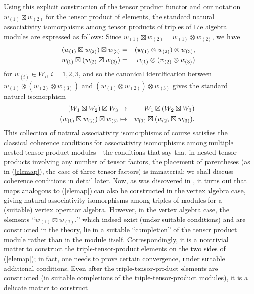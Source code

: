 \documentclass[12pt]{article}
\begin{document}
\begin{rema}
{\rm Using this explicit construction of the tensor product functor
and our notation $w_{(1)}\boxtimes w_{(2)}$ for the tensor product of
elements, the standard natural associativity isomorphisms among tensor
products of triples of Lie algebra modules are expressed as follows:
Since $w_{(1)}\boxtimes w_{(2)} = w_{(1)}\otimes w_{(2)}$, we have
\begin{eqnarray}\
(w_{(1)}\boxtimes w_{(2)})\boxtimes w_{(3)}&=&
(w_{(1)}\otimes w_{(2)})\otimes w_{(3)},\nonumber\\
w_{(1)}\boxtimes(w_{(2)}\boxtimes w_{(3)})&=&
w_{(1)}\otimes(w_{(2)}\otimes w_{(3)})\nonumber
\end{eqnarray}
for $w_{(i)}\in W_i$, $i=1,2,3$, and so
the canonical identification between
$w_{(1)}\otimes(w_{(2)}\otimes w_{(3)})$ and $(w_{(1)}\otimes
w_{(2)})\otimes w_{(3)}$ gives the standard natural isomorphism
\begin{eqnarray}
(W_1\boxtimes W_2)\boxtimes W_3 &\to & W_1\boxtimes (W_2\boxtimes W_3)\nonumber\\
(w_{(1)}\boxtimes w_{(2)})\boxtimes w_{(3)} &\mapsto &
w_{(1)}\boxtimes(w_{(2)}\boxtimes w_{(3)}).\label{elemap}
\end{eqnarray}
This collection of natural associativity isomorphisms of course
satisfies the classical coherence conditions for associativity
isomorphisms among multiple nested tensor product modules---the
conditions that say that in nested tensor products involving any
number of tensor factors, the placement of parentheses (as in
(\ref{elemap}), the case of three tensor factors) is immaterial; we
shall discuss coherence conditions in detail later.  Now, as was
discovered in \cite{tensor4}, it turns out that maps analogous to
(\ref{elemap}) can also be constructed in the vertex algebra case,
giving natural associativity isomorphisms among triples of modules for
a (suitable) vertex operator algebra.  However, in the vertex algebra
case, the elements ``$w_{(1)}\boxtimes w_{(2)}$,'' which indeed exist
(under suitable conditions) and are constructed in the theory, lie in
a suitable ``completion'' of the tensor product module rather than in
the module itself.  Correspondingly, it is a nontrivial matter to
construct the triple-tensor-product elements on the two sides of
(\ref{elemap}); in fact, one needs to prove certain convergence, under
suitable additional conditions.  Even after the triple-tensor-product
elements are constructed (in suitable completions of the
triple-tensor-product modules), it is a delicate matter to construct
}
\end{rema}
\end{document}
